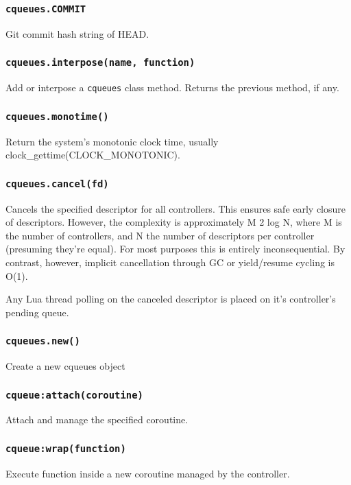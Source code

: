\documentclass[11pt, oneside]{memoir}
\newcommand*{\cqueues}[0]{\texttt{cqueues}\xspace}
\newcommand*{\routine}[1]{\texttt{#1}\xspace}
\begin{document}
\subsubsection{\routine{cqueues.COMMIT}}
Git commit hash string of HEAD.

\subsubsection[\routine{cqueues.interpose}]{\routine{cqueues.interpose(name, function)}}
Add or interpose a \cqueues class method. Returns the previous method, if any.

\subsubsection[\routine{cqueues.monotime}]{\routine{cqueues.monotime()}}
Return the system's monotonic clock time, usually clock\_gettime(CLOCK\_MONOTONIC).

\subsubsection[\routine{cqueues.cancel}]{\routine{cqueues.cancel(fd)}}
Cancels the specified descriptor for all controllers. This ensures safe early closure of descriptors. However, the complexity is approximately M 2 log N, where M is the number of controllers, and N the number of descriptors per controller (presuming they're equal). For most purposes this is entirely inconsequential. By contrast, however, implicit cancellation through GC or yield/resume cycling is O(1).

Any Lua thread polling on the canceled descriptor is placed on it's controller's pending queue.

\subsubsection[\routine{cqueues.new}]{\routine{cqueues.new()}}
Create a new cqueues object

\subsubsection[\routine{cqueues:attach}]{\routine{cqueue:attach(coroutine)}}
Attach and manage the specified coroutine.

\subsubsection[\routine{cqueues:wrap}]{\routine{cqueue:wrap(function)}}
        Execute function inside a new coroutine managed by the controller.
\end{document}
